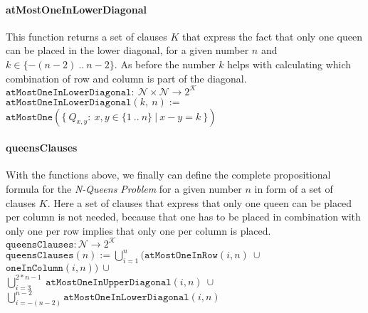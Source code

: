 \paragraph{atMostOneInLowerDiagonal}
This function returns a set of clauses $K$ that express the fact that only one queen can be placed in the lower diagonal, for a given number $n$ and $k \in \{-(n - 2)\ ..\ n - 2\}$. As before the number $k$ helps with calculating which combination of row and column is part of the diagonal.
\\[0.2cm]
\hspace*{1.3cm} $\texttt{atMostOneInLowerDiagonal}:\ \mathcal{N} \times \mathcal{N} \to 2^{\mathcal{K}}$
\\[0.2cm]
\hspace*{1.3cm} $\texttt{atMostOneInLowerDiagonal}(k,\ n) :=$
\\
\hspace*{2.6cm} $\texttt{atMostOne}(\{\ Q_{x,y} :\ x,y \in \{1\ ..\ n\}\ |\ x - y = k\ \})$

\paragraph{queensClauses}
With the functions above, we finally can define the complete propositional formula for the \textit{N-Queens Problem} for a given number $n$ in form of a set of clauses $K$. Here a set of clauses that express that only one queen can be placed per column is not needed, because that one has to be placed in combination with only one per row implies that only one per column is placed.
\\[0.2cm]
\hspace*{1.3cm} $\texttt{queensClauses}: \mathcal{N} \to 2^{\mathcal{K}}$
\\[0.2cm]
\hspace*{1.3cm} $\texttt{queensClauses}(n) := \bigcup\limits_{i=1}^{n}(\texttt{atMostOneInRow}(i, n)\ \cup\ $
$\texttt{oneInColumn}(i, n))\ \cup\ $
\\[0.1cm]
\hspace*{6.1cm} $\bigcup\limits_{i=3}^{2 * n - 1}\ \texttt{atMostOneInUpperDiagonal}(i, n)\ \cup\ $
\\[0.1cm]
\hspace*{5.8cm} $\bigcup\limits_{i=-(n - 2)}^{n - 2}\texttt{atMostOneInLowerDiagonal}(i, n)$